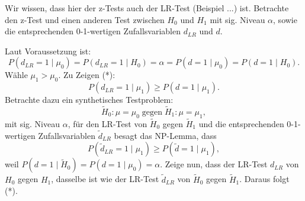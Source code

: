 \documentclass[10pt]{article}
\newcommand{\dlr}{d_{LR}}%
\newenvironment{BWS}[1][]
{\begin{Beweis}[frametitle=#1]}{\end{Beweis}}
\begin{document}
			\begin{BWS}[Beweis 2.1.2 (UMP z-Test)]
			Wir wissen, dass hier der z-Tests auch der LR-Test (Beispiel ...) ist. Betrachte den z-Test und einen anderen Test zwischen $H_0$ und $H_1$ mit sig. Niveau $\alpha$, sowie die entsprechenden 0-1-wertigen Zufallsvariablen $\dlr$ und $d$. 
			
			Laut Voraussetzung ist:
			\begin{equation*}
				P(\dlr = 1 \mid \mu_0) = P(\dlr = 1 \mid H_0) = \alpha = P(d=1 \mid \mu_0) = P(d =1 \mid H_0).
			\end{equation*}
			Wähle $\mu_1 > \mu_0$. Zu Zeigen (*):
			\begin{equation*}
				P(\dlr = 1 \mid \mu_1) \geq P(d=1 \mid \mu_1). 
			\end{equation*}
			Betrachte dazu ein synthetisches Testproblem:
			\begin{equation*}
				\tilde{H}_0: \mu = \mu_0 \; \text{gegen} \; \tilde{H}_1: \mu = \mu_1,
			\end{equation*}
			mit sig. Niveau $\alpha$, für den LR-Test von $	\tilde{H}_0$ gegen $\tilde{H}_1$ und die entsprechenden 0-1-wertigen Zufallsvariablen $\tilde{d}_{LR}$ besagt das NP-Lemma, dass 
			\begin{equation*}
				P(\tilde{d}_{LR} = 1 \mid \mu_1) \geq P(\tilde{d}=1 \mid \mu_1),
			\end{equation*}
			weil $P(d=1\mid \tilde{H}_0) = P(d=1 \mid \mu_0) = \alpha$. Zeige nun, dass der LR-Test $\dlr$ von $H_0$ gegen $H_1$, dasselbe ist wie der LR-Test $\tilde{d}_{LR}$ von $\tilde{H}_0$ gegen $\tilde{H}_1$. Daraus folgt (*).
			

\end{BWS}
\end{document}
